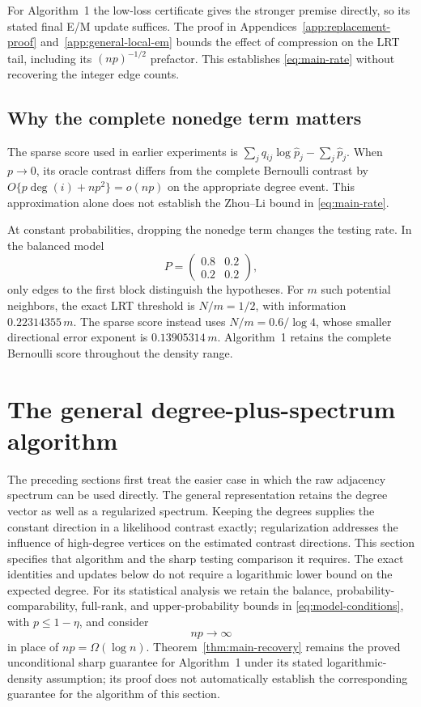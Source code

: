 \documentclass[11pt]{article}
\theoremstyle{definition}
\theoremstyle{remark}
\numberwithin{equation}{section}
\begin{document}
For Algorithm~1 the low-loss certificate gives the stronger premise directly, so its stated final E/M update suffices. The proof in Appendices~\ref{app:replacement-proof} and~\ref{app:general-local-em} bounds the effect of compression on the LRT tail, including its $(np)^{-1/2}$ prefactor. This establishes \eqref{eq:main-rate} without recovering the integer edge counts.

\subsection{Why the complete nonedge term matters}
The sparse score used in earlier experiments is
$\sum_jq_{ij}\log\widehat p_j-\sum_j\widehat p_j$.
When $p\to0$, its oracle contrast differs from the complete Bernoulli contrast by
$O\{p\deg(i)+np^2\}=o(np)$
on the appropriate degree event. This approximation alone does not establish the Zhou--Li bound in \eqref{eq:main-rate}.

At constant probabilities, dropping the nonedge term changes the testing rate. In the balanced model
\[
 P=\begin{pmatrix}0.8&0.2\\0.2&0.2\end{pmatrix},
\]
only edges to the first block distinguish the hypotheses. For $m$ such potential neighbors, the exact LRT threshold is $N/m=1/2$, with information $0.22314355\,m$. The sparse score instead uses $N/m=0.6/\log4$, whose smaller directional error exponent is $0.13905314\,m$. Algorithm~1 retains the complete Bernoulli score throughout the density range.

\section{The general degree-plus-spectrum algorithm}
\label{sec:degree-spectral}

The preceding sections first treat the easier case in which the raw adjacency
spectrum can be used directly. The general representation retains the degree
vector as well as a regularized spectrum. Keeping the degrees supplies the
constant direction in a likelihood contrast exactly; regularization addresses
the influence of high-degree vertices on the estimated contrast directions.
This section specifies that algorithm and the sharp testing comparison it
requires. The exact identities and updates below do not require a logarithmic
lower bound on the expected degree. For its statistical analysis we retain the
balance, probability-comparability, full-rank, and upper-probability bounds in
\eqref{eq:model-conditions}, with $p\le1-\eta$, and consider
\begin{equation}
 np\longrightarrow\infty
 \label{eq:general-density}
\end{equation}
in place of $np=\Omega(\log n)$. Theorem~\ref{thm:main-recovery} remains the
proved unconditional sharp guarantee for Algorithm~1 under its stated
logarithmic-density assumption; its proof does not automatically establish
the corresponding guarantee for the algorithm of this section.
\end{document}
